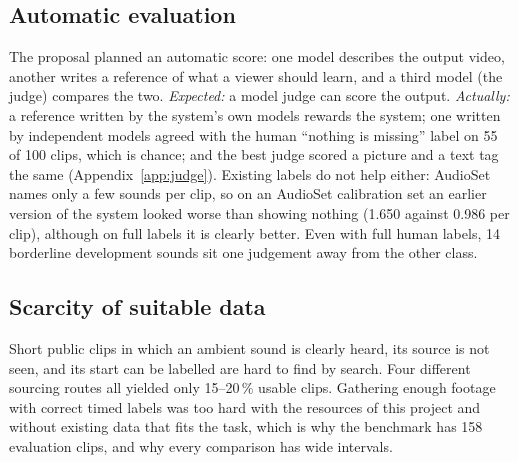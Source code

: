 \subsection{Automatic evaluation}\label{sec:hard-measure}
The proposal planned an automatic score: one model describes the output video, another writes a reference of what
a viewer should learn, and a third model (the judge) compares the two. \emph{Expected:} a model judge can score the
output. \emph{Actually:} a reference written by the system's own models
rewards the system; one written by independent models agreed with the human ``nothing is missing'' label on 55 of
100 clips, which is chance; and the best judge scored a picture and a text tag the same (Appendix~\ref{app:judge}).
Existing labels do not help either: AudioSet names only a few sounds per clip, so on an AudioSet calibration set an
earlier version of the system looked worse than showing nothing (1.650 against 0.986 per clip), although on full
labels it is clearly better. Even with full human
labels, 14 borderline development sounds sit one judgement away from the other class.

\subsection{Scarcity of suitable data}
Short public clips in which an ambient sound is clearly heard, its source is not seen, and its start can be labelled
are hard to find by search. Four different
sourcing routes all yielded only 15--20\,\% usable clips. Gathering enough footage with correct timed labels was
too hard with the resources of this project and without existing data that fits the task, which is why the benchmark
has 158 evaluation clips, and why every comparison has wide intervals.

